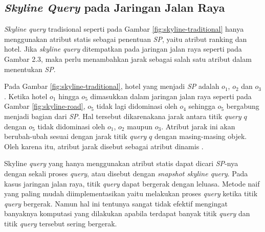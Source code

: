 \documentclass[conference]{IEEEtran}
\begin{document}

\subsection{\textit{Skyline Query} pada Jaringan Jalan Raya}
\textit{Skyline query} tradisional seperti pada Gambar \ref{fig:skyline-traditional} hanya menggunakan atribut statis sebagai penentuan \textit{SP}, yaitu atribut ranking dan hotel. Jika \textit{skyline query} ditempatkan pada jaringan jalan raya seperti pada Gambar 2.3, maka perlu menambahkan jarak sebagai salah satu atribut dalam menentukan \textit{SP}.

Pada Gambar \ref{fig:skyline-traditional}, hotel yang menjadi \textit{SP} adalah $ o_1 $, $ o_2 $ dan $ o_3 $. Ketika hotel $ o_1 $ hingga $ o_5 $ dimasukkan dalam jaringan jalan raya seperti pada Gambar \ref{fig:skyline-road}, $ o_5 $ tidak lagi didominasi oleh $ o_4 $ sehingga $ o_5 $ bergabung menjadi bagian dari \textit{SP}. Hal tersebut dikarenakana jarak antara titik \textit{query} $ q $ dengan $ o_5 $ tidak didominasi oleh $ o_1 $, $ o_2 $ maupun $ o_3 $. Atribut jarak ini akan berubah-ubah sesuai dengan jarak titik \textit{query} $ q $ dengan masing-masing objek. Oleh karena itu, atribut jarak disebut sebagai atribut dinamis \cite{continuousdbased}.

Skyline \textit{query} yang hanya menggunakan atribut statis dapat dicari \textit{SP}-nya dengan sekali proses \textit{query}, atau disebut dengan \textit{snapshot skyline query}. Pada kasus jaringan jalan raya, titik \textit{query} dapat bergerak dengan leluasa. Metode naif yang paling mudah diimplementasikan yaitu melakukan proses \textit{query} ketika titik \textit{query} bergerak. Namun hal ini tentunya sangat tidak efektif mengingat banyaknya komputasi yang dilakukan apabila terdapat banyak titik \textit{query} dan titik \textit{query} tersebut sering bergerak.
\end{document}
